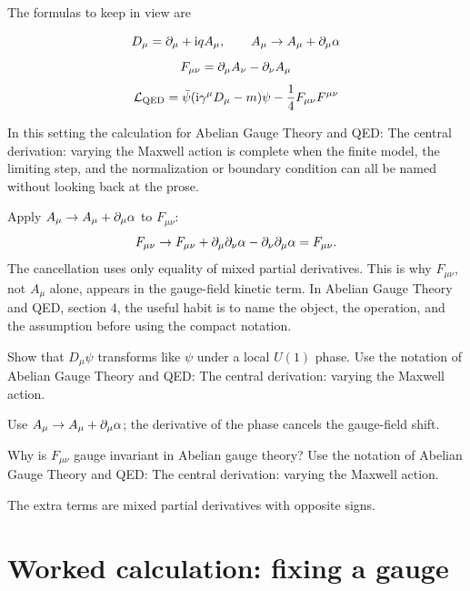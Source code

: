 The formulas to keep in view are

\[
  D_\mu=\partial_\mu+\mathrm i qA_\mu,\qquad A_\mu\to A_\mu+\partial_\mu\alpha
\]
\[
  F_{\mu\nu}=\partial_\mu A_\nu-\partial_\nu A_\mu
\]
\[
  \mathcal L_{\mathrm{QED}}=\bar\psi(\mathrm i\gamma^\mu D_\mu-m)\psi-\frac14F_{\mu\nu}F^{\mu\nu}
\]

In this setting the calculation for Abelian Gauge Theory and QED: The central derivation: varying the Maxwell action is complete when the finite model, the limiting step, and the normalization or boundary condition can all be named without looking back at the prose.




\begin{example}
Apply \(A_\mu\to A_\mu+\partial_\mu\alpha\) to \(F_{\mu\nu}\):
\[
  F_{\mu\nu}\to F_{\mu\nu}+\partial_\mu\partial_\nu\alpha-\partial_\nu\partial_\mu\alpha=F_{\mu\nu}.
\]
The cancellation uses only equality of mixed partial derivatives.  This is why \(F_{\mu\nu}\), not \(A_\mu\) alone, appears in the gauge-field kinetic term.  In Abelian Gauge Theory and QED, section 4, the useful habit is to name the object, the operation, and the assumption before using the compact notation.
\end{example}



\begin{exercise}
Show that \(D_\mu\psi\) transforms like \(\psi\) under a local \(U(1)\) phase.  Use the notation of Abelian Gauge Theory and QED: The central derivation: varying the Maxwell action.
\begin{answer}
Use \(A_\mu\to A_\mu+\partial_\mu\alpha\); the derivative of the phase cancels the gauge-field shift.
\end{answer}
\end{exercise}

\begin{exercise}
Why is \(F_{\mu\nu}\) gauge invariant in Abelian gauge theory?  Use the notation of Abelian Gauge Theory and QED: The central derivation: varying the Maxwell action.
\begin{answer}
The extra terms are mixed partial derivatives with opposite signs.
\end{answer}
\end{exercise}



\section{Worked calculation: fixing a gauge}

